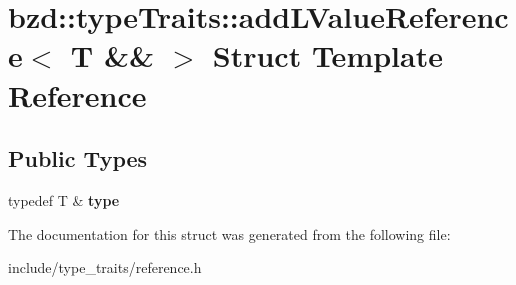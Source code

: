\hypertarget{structbzd_1_1typeTraits_1_1addLValueReference_3_01T_01_6_6_01_4}{}\section{bzd\+:\+:type\+Traits\+:\+:add\+L\+Value\+Reference$<$ T \&\& $>$ Struct Template Reference}
\label{structbzd_1_1typeTraits_1_1addLValueReference_3_01T_01_6_6_01_4}
\subsection*{Public Types}
\begin{DoxyCompactItemize}
\item 
\mbox{\label{structbzd_1_1typeTraits_1_1addLValueReference_3_01T_01_6_6_01_4_ac280744fe129b613f844978172e2e841}} 
typedef T \& {\bfseries type}
\end{DoxyCompactItemize}


The documentation for this struct was generated from the following file\+:\begin{DoxyCompactItemize}
\item 
include/type\+\_\+traits/reference.\+h\end{DoxyCompactItemize}
